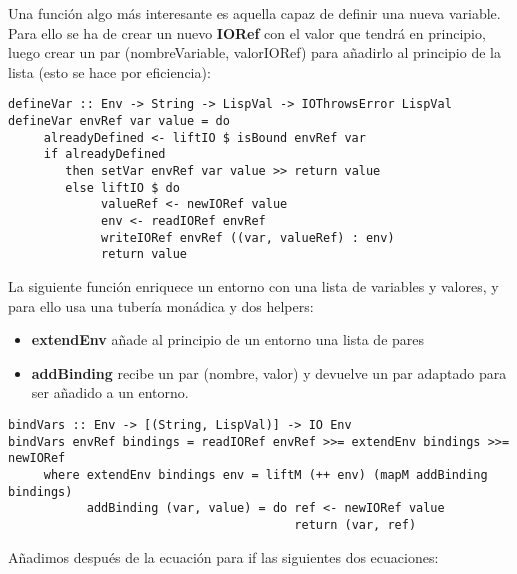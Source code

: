 Una funci\'on algo m\'as interesante es aquella capaz de definir una nueva variable. Para ello se ha de crear un nuevo \textbf{IORef} con el valor que tendr\'a en principio, luego crear un par (nombreVariable, valorIORef) para a\~{n}adirlo al principio de la lista (esto se hace por eficiencia):\\

\begin{minipage}{\linewidth}
\begin{footnotesize}
\begin{lstlisting}[frame=single]
defineVar :: Env -> String -> LispVal -> IOThrowsError LispVal
defineVar envRef var value = do
     alreadyDefined <- liftIO $ isBound envRef var
     if alreadyDefined
        then setVar envRef var value >> return value
        else liftIO $ do
             valueRef <- newIORef value
             env <- readIORef envRef
             writeIORef envRef ((var, valueRef) : env)
             return value
\end{lstlisting}
\end{footnotesize}
\end{minipage}

La siguiente funci\'on enriquece un entorno con una lista de variables y valores, y para ello usa una tuber\'ia mon\'adica y dos helpers:

\begin{itemize}
  \item \textbf{extendEnv} a\~{n}ade al principio de un entorno una lista de pares 
  \item \textbf{addBinding} recibe un par (nombre, valor) y devuelve un par adaptado para ser a\~{n}adido a un entorno.
\end{itemize}

\begin{minipage}{\linewidth}
\begin{scriptsize}
\begin{lstlisting}[frame=single]
bindVars :: Env -> [(String, LispVal)] -> IO Env
bindVars envRef bindings = readIORef envRef >>= extendEnv bindings >>= newIORef
     where extendEnv bindings env = liftM (++ env) (mapM addBinding bindings)
           addBinding (var, value) = do ref <- newIORef value
                                        return (var, ref)
\end{lstlisting}
\end{scriptsize}
\end{minipage}

A\~{n}adimos despu\'es de la ecuaci\'on para if las siguientes dos ecuaciones:\\

